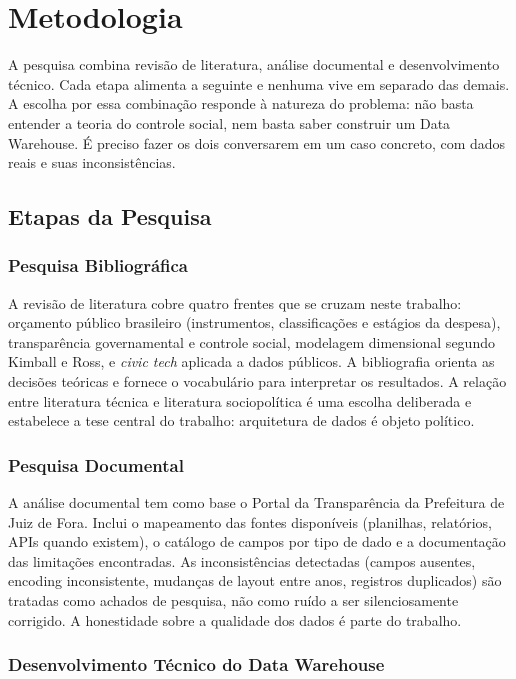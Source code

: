 \chapter{Metodologia}
\label{cap:metodologia}

A pesquisa combina revisão de literatura, análise documental e desenvolvimento técnico. Cada etapa alimenta a seguinte e nenhuma vive em separado das demais. A escolha por essa combinação responde à natureza do problema: não basta entender a teoria do controle social, nem basta saber construir um Data Warehouse. É preciso fazer os dois conversarem em um caso concreto, com dados reais e suas inconsistências.

\section{Etapas da Pesquisa}

\subsection*{Pesquisa Bibliográfica}

A revisão de literatura cobre quatro frentes que se cruzam neste trabalho: orçamento público brasileiro (instrumentos, classificações e estágios da despesa), transparência governamental e controle social, modelagem dimensional segundo Kimball e Ross, e \textit{civic tech} aplicada a dados públicos. A bibliografia orienta as decisões teóricas e fornece o vocabulário para interpretar os resultados. A relação entre literatura técnica e literatura sociopolítica é uma escolha deliberada e estabelece a tese central do trabalho: arquitetura de dados é objeto político.

\subsection*{Pesquisa Documental}

A análise documental tem como base o Portal da Transparência da Prefeitura de Juiz de Fora. Inclui o mapeamento das fontes disponíveis (planilhas, relatórios, APIs quando existem), o catálogo de campos por tipo de dado e a documentação das limitações encontradas. As inconsistências detectadas (campos ausentes, encoding inconsistente, mudanças de layout entre anos, registros duplicados) são tratadas como achados de pesquisa, não como ruído a ser silenciosamente corrigido. A honestidade sobre a qualidade dos dados é parte do trabalho.

\subsection*{Desenvolvimento Técnico do Data Warehouse}


